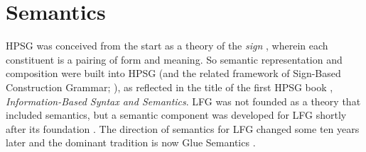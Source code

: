 

\section{Semantics}


\largerpage\enlargethispage{2pt}
HPSG  was conceived from the
start as  a theory of the \textit{sign} \citep{Saussure16a-Fr}, 
wherein each constituent is a pairing of form and meaning.  
So semantic representation and composition  were built into HPSG (and the 
related framework of Sign-Based Construction Grammar;
 \citealt{BS2012a-ed}), as reflected in the title of the first HPSG
book \citep{pollard;sag87}, \textit{Information-Based Syntax and
  Semantics}.  LFG was not founded as a theory that included semantics, but a semantic component was developed for LFG shortly after its foundation \citep{halvorsen83}.  The direction of semantics for LFG changed some ten years later and the dominant tradition is now Glue Semantics \citep{dalrymple;ea93,dalrymple99,Dalrymple2001a-u,asudeh-lpr,dalrymple;ea19}.  

